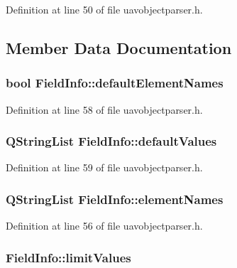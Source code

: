 Definition at line 50 of file uavobjectparser.\-h.



\subsection{Member Data Documentation}
\hypertarget{struct_field_info_a1782f0245c493a8962d7a85e7f84c80d}{
\subsubsection[{default\-Element\-Names}]{\setlength{\rightskip}{0pt plus 5cm}bool Field\-Info\-::default\-Element\-Names}}\label{struct_field_info_a1782f0245c493a8962d7a85e7f84c80d}


Definition at line 58 of file uavobjectparser.\-h.

\hypertarget{struct_field_info_ad2ac81dee4a7a1e956145bc4160ef5f1}{
\subsubsection[{default\-Values}]{\setlength{\rightskip}{0pt plus 5cm}Q\-String\-List Field\-Info\-::default\-Values}}\label{struct_field_info_ad2ac81dee4a7a1e956145bc4160ef5f1}


Definition at line 59 of file uavobjectparser.\-h.

\hypertarget{struct_field_info_abbf4c6f307fbb7644411f4203a8f6a6f}{
\subsubsection[{element\-Names}]{\setlength{\rightskip}{0pt plus 5cm}Q\-String\-List Field\-Info\-::element\-Names}}\label{struct_field_info_abbf4c6f307fbb7644411f4203a8f6a6f}


Definition at line 56 of file uavobjectparser.\-h.

\hypertarget{struct_field_info_af973f5eaeafa286bf804183878014a66}{
\subsubsection[{limit\-Values}]{ Field\-Info\-::limit\-Values}}\label{struct_field_info_af973f5eaeafa286bf804183878014a66}


